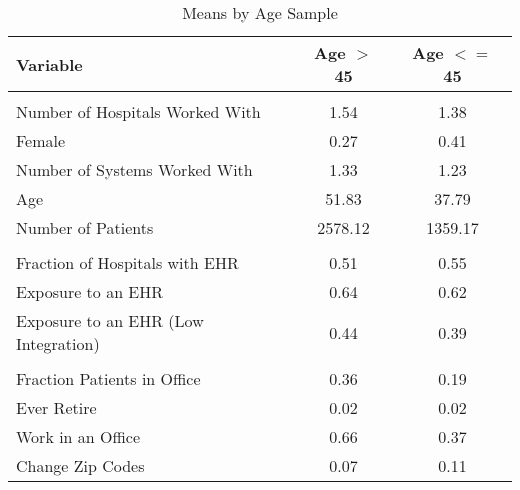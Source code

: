 \begin{table}[h]

\caption{Means by Age Sample}
\centering
\begin{tabular}[t]{lcc}
\toprule
Variable & Age $>$ 45 & Age $<=$ 45\\
\midrule
\addlinespace[0.3em]
\multicolumn{3}{l}{\textbf{Outcomes}}\\
\hspace{1em}Number of Hospitals Worked With & 1.54 & 1.38\\
\hspace{1em}Female & 0.27 & 0.41\\
\hspace{1em}Number of Systems Worked With & 1.33 & 1.23\\
\hspace{1em}Age & 51.83 & 37.79\\
\hspace{1em}Number of Patients & 2578.12 & 1359.17\\
\addlinespace[0.3em]
\multicolumn{3}{l}{\textbf{Treatment}}\\
\hspace{1em}Fraction of Hospitals with EHR & 0.51 & 0.55\\
\hspace{1em}Exposure to an EHR & 0.64 & 0.62\\
\hspace{1em}Exposure to an EHR (Low Integration) & 0.44 & 0.39\\
\addlinespace[0.3em]
\multicolumn{3}{l}{\textbf{Characteristics}}\\
\hspace{1em}Fraction Patients in Office & 0.36 & 0.19\\
\hspace{1em}Ever Retire & 0.02 & 0.02\\
\hspace{1em}Work in an Office & 0.66 & 0.37\\
\hspace{1em}Change Zip Codes & 0.07 & 0.11\\
\bottomrule
\end{tabular}
\end{table}
